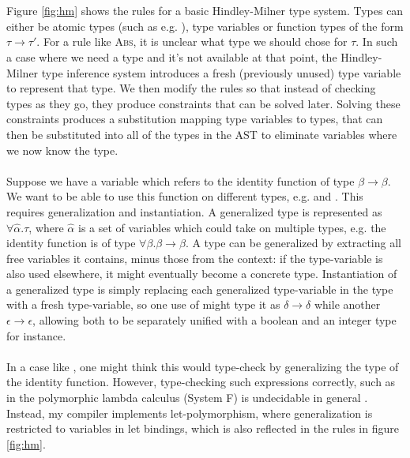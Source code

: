 \\\\
Figure \ref{fig:hm} shows the rules for a basic Hindley-Milner type system. Types can either be atomic types (such as e.g. ), type variables or function types of the form $\tau \rightarrow \tau'$. For a rule like \textsc{Abs}, it is unclear what type we should chose for $\tau$. In such a case where we need a type and it's not available at that point, the Hindley-Milner type inference system introduces a fresh (previously unused) type variable to represent that type. We then modify the rules so that instead of checking types as they go, they produce constraints that can be solved later. Solving these constraints produces a substitution mapping type variables to types, that can then be substituted into all of the types in the AST to eliminate variables where we now know the type.
\\\\
Suppose we have a variable  which refers to the identity function  of type $\beta \rightarrow \beta$. We want to be able to use this function on different types, e.g.  and . This requires generalization and instantiation. A generalized type is represented as $\forall \hat{\alpha}. \tau$, where $\hat{\alpha}$ is a set of variables which could take on multiple types, e.g. the identity function is of type $\forall \beta. \beta \rightarrow \beta$. A type can be generalized by extracting all free variables it contains, minus those from the context: if the type-variable is also used elsewhere, it might eventually become a concrete type. Instantiation of a generalized type is simply replacing each generalized type-variable in the type with a fresh type-variable, so one use of  might type it as $\delta \rightarrow \delta$ while another $\epsilon \rightarrow \epsilon$, allowing both to be separately unified with a boolean and an integer type for instance.
\\\\
In a case like , one might think this would type-check by generalizing the type of the identity function. However, type-checking such expressions correctly, such as in the polymorphic lambda calculus (System F) is undecidable in general \cite{SystemFUndecidable}. Instead, my compiler implements let-polymorphism, where generalization is restricted to variables in let bindings, which is also reflected in the rules in figure \ref{fig:hm}.
